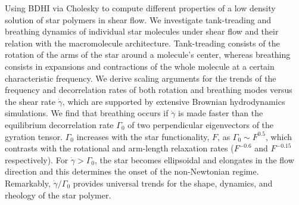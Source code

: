 \documentclass[ twoside,openright,titlepage,numbers=noenddot,%
headinclude,footinclude,cleardoublepage=empty,abstract=on,
BCOR=5mm,paper=a4,fontsize=11pt, dvipsnames
]{scrreprt}
\begin{document}
Using \gls{BDHI} via Cholesky to compute different properties of a low density solution of star polymers in shear flow.
We investigate tank-treading and breathing dynamics of individual star molecules under shear flow and their relation with the macromolecule architecture. Tank-treading consists of the rotation of the arms of the star around a molecule’s center, whereas breathing consists in expansions and contractions of the whole molecule at a certain characteristic frequency. We derive scaling arguments for the trends of the frequency and decorrelation rates of both rotation and breathing modes versus the shear rate $\dot{\gamma}$, which are supported by extensive Brownian hydrodynamics simulations. We find that breathing occurs if $\dot{\gamma}$ is made faster than the equilibrium decorrelation rate $\Gamma_0$ of two perpendicular eigenvectors of the gyration tensor. $\Gamma_0$ increases with the star functionality, $F$, as $\Gamma_0 \sim F^{0.5}$, which contrasts with the rotational and arm-length relaxation rates ($F^{-0.6}$ and $F^ {-0.15}$ respectively). For $\dot{\gamma} > \Gamma_0$, the star becomes ellipsoidal and elongates in the flow direction and this determines the onset of the non-Newtonian regime. Remarkably, $\dot{\gamma}/\Gamma_0$ provides universal trends for the shape, dynamics, and rheology of the star polymer.
%
%
\end{document}
